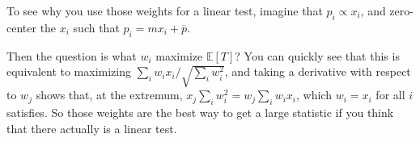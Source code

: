 To see why you use those weights for a linear test, imagine that
\(p_i \propto x_i\), and zero-center the \(x_i\) such that
\(p_i = m x_i + \overline{p}\).

Then the question is what \(w_i\) maximize \(\mathbb{E}[T]\)? You can
quickly see that this is equivalent to maximizing
\(\sum_i w_i x_i / \sqrt{\sum_i w_i^2}\), and taking a derivative with
respect to \(w_j\) shows that, at the extremum,
\(x_j \sum_i w_i^2 = w_j \sum_i w_i x_i\), which \(w_i = x_i\) for all
\(i\) satisfies. So those weights are the best way to get a large
statistic if you think that there actually is a linear test.